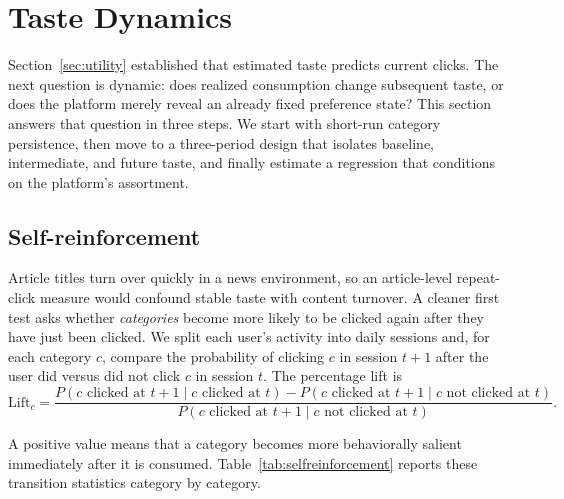 \documentclass[11pt]{article}
\begin{document}
\section{Taste Dynamics}
\label{sec:taste}

Section~\ref{sec:utility} established that estimated taste predicts current clicks. The next question is dynamic: does realized consumption change subsequent taste, or does the platform merely reveal an already fixed preference state? This section answers that question in three steps. We start with short-run category persistence, then move to a three-period design that isolates baseline, intermediate, and future taste, and finally estimate a regression that conditions on the platform's assortment.

\subsection{Self-reinforcement}

Article titles turn over quickly in a news environment, so an article-level repeat-click measure would confound stable taste with content turnover. A cleaner first test asks whether \emph{categories} become more likely to be clicked again after they have just been clicked. We split each user's activity into daily sessions and, for each category $c$, compare the probability of clicking $c$ in session $t+1$ after the user did versus did not click $c$ in session $t$. The percentage lift is
\[
\text{Lift}_c =
\frac{
P(c\text{ clicked at }t{+}1 \mid c\text{ clicked at }t)
-
P(c\text{ clicked at }t{+}1 \mid c\text{ not clicked at }t)
}{
P(c\text{ clicked at }t{+}1 \mid c\text{ not clicked at }t)
}.
\]

A positive value means that a category becomes more behaviorally salient immediately after it is consumed. Table~\ref{tab:selfreinforcement} reports these transition statistics category by category.
\end{document}
